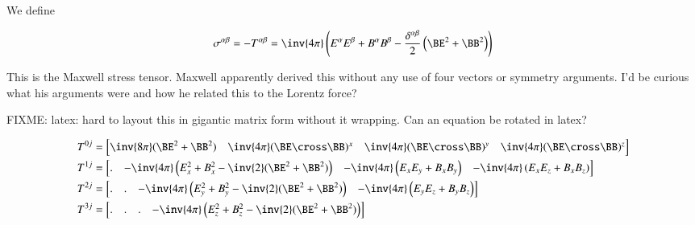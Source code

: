 We define

\begin{equation}\label{eqn:relativisticElectrodynamicsL23:230}
\sigma^{\alpha\beta}
=
-T^{\alpha\beta}
=
 \inv{4\pi} \left(
E^\alpha E^\beta
+B^\alpha B^\beta
- \frac{\delta^{\alpha\beta} }{2}
\left(
\BE^2 + \BB^2 
\right)
\right) 
\end{equation}

This is the Maxwell stress tensor.  Maxwell apparently derived this without any use of four vectors or symmetry arguments.  I'd be curious what his arguments were and how he related this to the Lorentz force?

FIXME: latex: hard to layout this in gigantic matrix form without it wrapping.  Can an equation be rotated in latex?

\begin{equation}\label{eqn:relativisticElectrodynamicsL23:250}
\begin{aligned}
&T^{0j} =
\begin{bmatrix}
\inv{8 \pi}(\BE^2 + \BB^2) & \inv{4\pi} (\BE \cross \BB)^x & \inv{4\pi} (\BE \cross \BB)^y & \inv{4\pi} (\BE \cross \BB)^z 
\end{bmatrix} 
\\
&T^{1j} =
\begin{bmatrix}
. 
& -\inv{4 \pi}\left(E_x^2 + B_x^2 - \inv{2}(\BE^2 + \BB^2)\right) 
& -\inv{4 \pi}\left(E_x E_y + B_x B_y \right)
& -\inv{4 \pi}\left(E_x E_z + B_x B_z \right) 
\end{bmatrix} \\
&T^{2j} =
\begin{bmatrix}
. & . & -\inv{4 \pi}\left(E_y^2 + B_y^2 - \inv{2}(\BE^2 + \BB^2)\right) & -\inv{4 \pi}\left(E_y E_z + B_y B_z \right) 
\end{bmatrix}
\\
&T^{3j} =
\begin{bmatrix}
. & . & . & -\inv{4 \pi}\left(E_z^2 + B_z^2 - \inv{2}(\BE^2 + \BB^2)\right) 
\end{bmatrix}
\end{aligned}
\end{equation}

